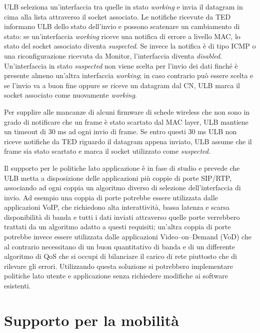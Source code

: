 \documentclass[12pt,a4paper,openright,twoside]{book}
\begin{document}
ULB seleziona un'interfaccia tra quelle in stato \emph{working} e
invia il datagram in cima alla lista attraverso il socket
associato. Le notifiche ricevute da TED informano ULB dello stato
dell'invio e possono scatenare un cambiamento di stato: se
un'interfaccia \emph{working} riceve una notifica di errore a livello
MAC, lo stato del socket associato diventa \emph{suspected}. Se invece
la notifica è di tipo ICMP o una riconfigurazione ricevuta da Monitor,
l'interfaccia diventa \emph{disabled}. Un'interfaccia in stato
\emph{suspected} non viene scelta per l'invio dei dati finché è
presente almeno un'altra interfaccia \emph{working}; in caso contrario
può essere scelta e se l'invio va a buon fine oppure se riceve un
datagram dal CN, ULB marca il socket associato come nuovamente
\emph{working}.

Per supplire alle mancanze di alcuni firmware di schede wireless che
non sono in grado di notificare che un frame è stato scartato dal MAC
layer, ULB mantiene un timeout di 30 ms ad ogni invio di frame. Se
entro questi 30 ms ULB non riceve notifiche da TED riguardo il
datagram appena inviato, ULB assume che il frame sia stato scartato e
marca il socket utilizzato come \emph{suspected}.

Il supporto per le politiche lato applicazione è in fase di studio e
prevede che ULB metta a disposizione delle applicazioni più coppie di
porte SIP/RTP, associando ad ogni coppia un algoritmo diverso di
selezione dell'interfaccia di invio. Ad esempio una coppia di porte
potrebbe essere utilizzata dalle applicazioni VoIP, che richiedono
alta interattività, bassa latenza e scarsa disponibilità di banda e
tutti i dati inviati attraverso quelle porte verrebbero trattati da un
algoritmo adatto a questi requisiti; un'altra coppia di porte potrebbe
invece essere utilizzata dalle applicazioni Video--on--Demand (VoD)
che al contrario necessitano di un buon quantitativo di banda e di un
differente algoritmo di QoS che si occupi di bilanciare il carico di
rete piuttosto che di rilevare gli errori. Utilizzando questa
soluzione si potrebbero implementare politiche lato utente e
applicazione senza richiedere modifiche ai software esistenti.

\section{Supporto per la mobilità}
\end{document}
